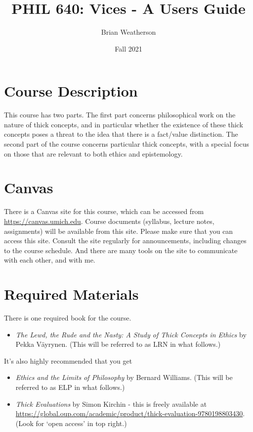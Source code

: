 \documentclass[
]{article}
\title{PHIL 640: Vices - A Users Guide}
\author{Brian Weatherson}
\date{Fall 2021}
\providecommand{\tightlist}{%
  \setlength{\itemsep}{0pt}\setlength{\parskip}{0pt}}
\begin{document}
\maketitle

\hypertarget{course-description}{%
\section{Course Description}\label{course-description}}

This course has two parts. The first part concerns philosophical work on
the nature of thick concepts, and in particular whether the existence of
these thick concepts poses a threat to the idea that there is a
fact/value distinction. The second part of the course concerns
particular thick concepts, with a special focus on those that are
relevant to both ethics and epistemology.

\hypertarget{canvas}{%
\section{Canvas}\label{canvas}}

There is a Canvas site for this course, which can be accessed from
\url{https://canvas.umich.edu}. Course documents (syllabus, lecture
notes, assignments) will be available from this site. Please make sure
that you can access this site. Consult the site regularly for
announcements, including changes to the course schedule. And there are
many tools on the site to communicate with each other, and with me.

\hypertarget{required-materials}{%
\section{Required Materials}\label{required-materials}}

There is one required book for the course.

\begin{itemize}
\tightlist
\item
  \emph{The Lewd, the Rude and the Nasty: A Study of Thick Concepts in
  Ethics} by Pekka Väyrynen. (This will be referred to as LRN in what
  follows.)
\end{itemize}

It's also highly recommended that you get

\begin{itemize}
\tightlist
\item
  \emph{Ethics and the Limits of Philosophy} by Bernard Williams. (This
  will be referred to as ELP in what follows.)
\item
  \emph{Thick Evaluations} by Simon Kirchin - this is freely available
  at
  \url{https://global.oup.com/academic/product/thick-evaluation-9780198803430}.
  (Look for `open access' in top right.)
\end{itemize}
\end{document}
